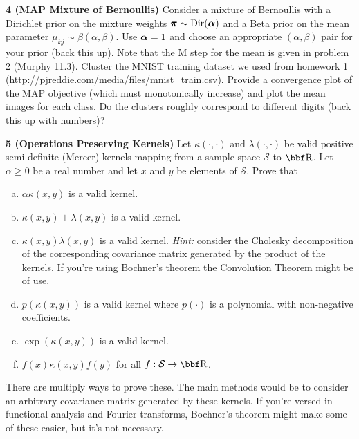 \documentclass[12pt,letterpaper,fleqn]{hmcpset}
\begin{document}
\textbf{4 (MAP Mixture of Bernoullis)} Consider a mixture of Bernoullis with a Dirichlet prior on the mixture
weights $\hbox{\boldmath$\pi$} \sim \mathrm{Dir}(\hbox{\boldmath$\alpha$})$ and a Beta prior on the mean parameter $\mu_{kj} \sim \beta(\alpha,\beta)$.
Use $\hbox{\boldmath$\alpha$}=1$ and choose an appropriate $(\alpha,\beta)$ pair for your prior (back this up).
Note that the M step for the mean is given in problem 2 (Murphy 11.3). Cluster the MNIST training dataset we used
from homework 1 (\url{http://pjreddie.com/media/files/mnist_train.csv}). Provide a convergence plot of the MAP objective
(which must monotonically increase) and plot the mean images for each class. Do the clusters roughly correspond to
different digits (back this up with numbers)?

\textbf{5 (Operations Preserving Kernels)} Let $\kappa(\cdot,\cdot)$ and $\lambda(\cdot,\cdot)$ be valid positive
semi-definite (Mercer) kernels mapping from a sample space $\mathcal{S}$ to $\RR$. Let $\alpha \geq 0$ be a real number
and let $x$ and $y$ be elements of $\mathcal{S}$. Prove that
\begin{enumerate}[(a)]
    \item $\alpha\kappa(x,y)$ is a valid kernel.
    \item $\kappa(x,y) + \lambda(x,y)$ is a valid kernel.
    \item $\kappa(x,y)\lambda(x,y)$ is a valid kernel. \textit{Hint:} consider the Cholesky decomposition
        of the corresponding covariance matrix generated by the product of the kernels. If you're using Bochner's
        theorem the Convolution Theorem might be of use.
    \item $p(\kappa(x,y))$ is a valid kernel where $p(\cdot)$ is a polynomial
        with non-negative coefficients.
    \item $\exp(\kappa(x,y))$ is a valid kernel.
    \item $f(x)\kappa(x,y)f(y)$ for all $f : \mathcal{S}\to\RR$.
\end{enumerate}
There are multiply ways to prove these. The main methods would be to consider an arbitrary covariance matrix
generated by these kernels. If you're versed in functional analysis and Fourier transforms, Bochner's theorem
might make some of these easier, but it's not necessary.
\end{document}
